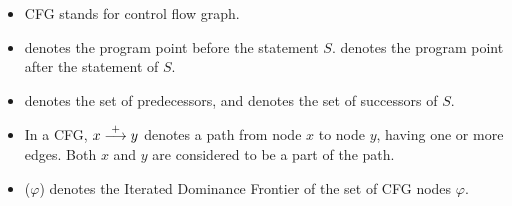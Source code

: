 \documentclass[12pt]{article}
\begin{document}
\begin{itemize}
\item CFG stands for control flow graph.
\item {} denotes the program point before the statement
  $S$.  denotes the program point after
  the statement of $S$.
\item {} denotes the set of predecessors, and 
  denotes the set of successors of $S$. %
\item In a CFG, $x \stackrel{+}{\longrightarrow} y$ denotes a path from
  node $x$ to node $y$, having one or more edges. Both $x$ and
  $y$ are considered to be a part of the path.
\item \idfp($\varphi$) denotes the Iterated Dominance Frontier of
  the set of CFG nodes $\varphi$.
\end{itemize}
\clearpage
\end{document}

